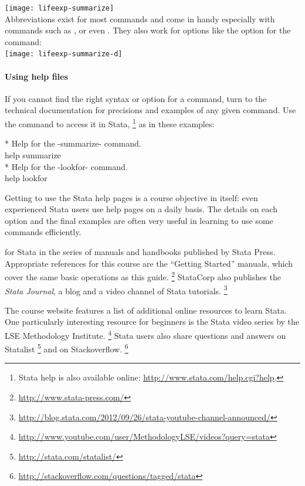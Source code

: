   	\texttt{[image: lifeexp-summarize]}\\[1em]

  Abbreviations exist for most commands and come in handy especially with commands such as ,  or even . They also work for options like the  option for the  command:\\[1em]%

  	\texttt{[image: lifeexp-summarize-d]}\\[1em]
  
		\paragraph{Using help files}%

		If you cannot find the right syntax or option for a command, turn to the technical documentation for precisions and examples of any given command. Use the  command to access it in Stata,%
    		\footnote{Stata help is also available online: \url{http://www.stata.com/help.cgi?help}.} %
        as in these examples:%

		\begin{docspec}
			* Help for the -summarize- command.\\
			help summarize\\[1em]
	
			* Help for the -lookfor- command.\\
			help lookfor
		\end{docspec}

    Getting to use the Stata help pages is a course objective in itself: even experienced Stata users use help pages on a daily basis. The details on each option and the final examples are often very useful in learning to use some commands efficiently.%

     for Stata in the series of manuals and handbooks published by Stata Press. Appropriate references for this course are the ``Getting Started'' manuals, which cover the same basic operations as this guide.%
      \footnote{\url{http://www.stata-press.com/}} %
      StataCorp also publishes the \emph{Stata Journal}, a blog and a video channel of Stata tutorials.%
      \footnote{\url{http://blog.stata.com/2012/09/26/stata-youtube-channel-announced/}}
  
    The course website features a list of additional online resources to learn Stata. One particularly interesting resource for beginners is the Stata video series by the LSE Methodology Institute.%
      \footnote{\url{http://www.youtube.com/user/MethodologyLSE/videos?query=stata}} %
      Stata users also share questions and answers on Statalist%
      \footnote{\url{http://stata.com/statalist/}} %
      and on Stackoverflow.%
      \footnote{\url{http://stackoverflow.com/questions/tagged/stata}}


